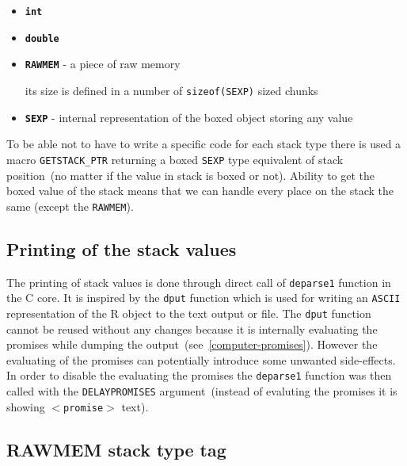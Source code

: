 \documentclass[thesis=M,english]{FITthesis}[2018/10/20]
\newcommand{\code}[1]{\texttt{#1}}
\begin{document}
\begin{itemize}
	\item \textbf{\code{int}}
	\item \textbf{\code{double}}
	\item \textbf{\code{RAWMEM}} - a piece of raw memory

		its size is defined in a number of \code{sizeof(SEXP)} sized chunks
	\item \textbf{\code{SEXP}} - internal representation of the boxed object storing any value
\end{itemize}

To be able not to have to write a specific code for each stack type there is used a macro \code{GETSTACK{\_}PTR} returning a boxed \code{SEXP} type equivalent of stack position~(no matter if the value in stack is boxed or not). Ability to get the boxed value of the stack means that we can handle every place on the stack the same (except the \code{RAWMEM}).

\subsection{Printing of the stack values}\label{printing-stack-values}

The printing of stack values is done through direct call of \code{deparse1} function in the C core. It is inspired by the \code{dput} function which is used for writing an \code{ASCII} representation of the R object to the text output or file. The \code{dput} function cannot be reused without any changes because it is internally evaluating the promises while dumping the output~(see~\ref{computer-promises}). However the evaluating of the promises can potentially introduce some unwanted side-effects. In order to disable the evaluating the promises the \code{deparse1} function was then called with the \code{DELAYPROMISES} argument~(instead of evaluting the promises it is showing \code{$<$promise$>$} text).

\subsection{RAWMEM stack type tag}
\end{document}
